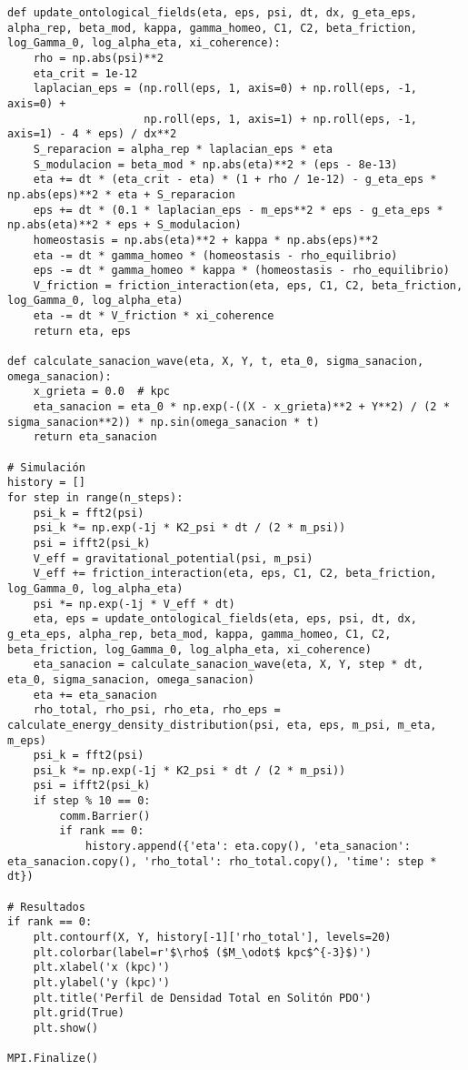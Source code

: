 \documentclass[a4paper,12pt]{article}
\begin{document}
\begin{verbatim}
def update_ontological_fields(eta, eps, psi, dt, dx, g_eta_eps, alpha_rep, beta_mod, kappa, gamma_homeo, C1, C2, beta_friction, log_Gamma_0, log_alpha_eta, xi_coherence):
    rho = np.abs(psi)**2
    eta_crit = 1e-12
    laplacian_eps = (np.roll(eps, 1, axis=0) + np.roll(eps, -1, axis=0) +
                     np.roll(eps, 1, axis=1) + np.roll(eps, -1, axis=1) - 4 * eps) / dx**2
    S_reparacion = alpha_rep * laplacian_eps * eta
    S_modulacion = beta_mod * np.abs(eta)**2 * (eps - 8e-13)
    eta += dt * (eta_crit - eta) * (1 + rho / 1e-12) - g_eta_eps * np.abs(eps)**2 * eta + S_reparacion
    eps += dt * (0.1 * laplacian_eps - m_eps**2 * eps - g_eta_eps * np.abs(eta)**2 * eps + S_modulacion)
    homeostasis = np.abs(eta)**2 + kappa * np.abs(eps)**2
    eta -= dt * gamma_homeo * (homeostasis - rho_equilibrio)
    eps -= dt * gamma_homeo * kappa * (homeostasis - rho_equilibrio)
    V_friction = friction_interaction(eta, eps, C1, C2, beta_friction, log_Gamma_0, log_alpha_eta)
    eta -= dt * V_friction * xi_coherence
    return eta, eps

def calculate_sanacion_wave(eta, X, Y, t, eta_0, sigma_sanacion, omega_sanacion):
    x_grieta = 0.0  # kpc
    eta_sanacion = eta_0 * np.exp(-((X - x_grieta)**2 + Y**2) / (2 * sigma_sanacion**2)) * np.sin(omega_sanacion * t)
    return eta_sanacion

# Simulación
history = []
for step in range(n_steps):
    psi_k = fft2(psi)
    psi_k *= np.exp(-1j * K2_psi * dt / (2 * m_psi))
    psi = ifft2(psi_k)
    V_eff = gravitational_potential(psi, m_psi)
    V_eff += friction_interaction(eta, eps, C1, C2, beta_friction, log_Gamma_0, log_alpha_eta)
    psi *= np.exp(-1j * V_eff * dt)
    eta, eps = update_ontological_fields(eta, eps, psi, dt, dx, g_eta_eps, alpha_rep, beta_mod, kappa, gamma_homeo, C1, C2, beta_friction, log_Gamma_0, log_alpha_eta, xi_coherence)
    eta_sanacion = calculate_sanacion_wave(eta, X, Y, step * dt, eta_0, sigma_sanacion, omega_sanacion)
    eta += eta_sanacion
    rho_total, rho_psi, rho_eta, rho_eps = calculate_energy_density_distribution(psi, eta, eps, m_psi, m_eta, m_eps)
    psi_k = fft2(psi)
    psi_k *= np.exp(-1j * K2_psi * dt / (2 * m_psi))
    psi = ifft2(psi_k)
    if step % 10 == 0:
        comm.Barrier()
        if rank == 0:
            history.append({'eta': eta.copy(), 'eta_sanacion': eta_sanacion.copy(), 'rho_total': rho_total.copy(), 'time': step * dt})

# Resultados
if rank == 0:
    plt.contourf(X, Y, history[-1]['rho_total'], levels=20)
    plt.colorbar(label=r'$\rho$ ($M_\odot$ kpc$^{-3}$)')
    plt.xlabel('x (kpc)')
    plt.ylabel('y (kpc)')
    plt.title('Perfil de Densidad Total en Solitón PDO')
    plt.grid(True)
    plt.show()

MPI.Finalize()
\end{verbatim}
\end{document}
